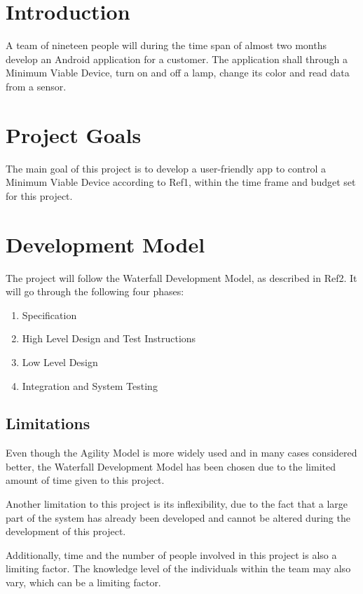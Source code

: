 \documentclass[a4paper]{article}
\begin{document}
\section{Introduction}
A team of nineteen people will during the time span of almost two months develop an Android application for a customer. The application shall through a Minimum Viable Device, turn on and off a lamp, change its color and read data from a sensor.

\section{Project Goals}
The main goal of this project is to develop a user-friendly app to control a Minimum Viable Device according to  Ref1, within the time frame and budget set for this project.

\section{Development Model}
The project will follow the Waterfall Development Model, as described in Ref2. It will go through the following four phases:

\begin{enumerate}
\item Specification
\item High Level Design and Test Instructions
\item Low Level Design
\item Integration and System Testing
\end{enumerate}

\subsection{Limitations}
Even though the Agility Model is more widely used and in many cases considered better, the Waterfall Development Model has been chosen due to the limited amount of time given to this project. 

Another limitation to this project is its inflexibility, due to the fact that a large part of the system has already been developed and cannot be altered during the development of this project.

Additionally, time and the number of people involved in this project is also a limiting factor. The knowledge level of the individuals within the team may also vary, which can be a limiting factor.   
\end{document}
